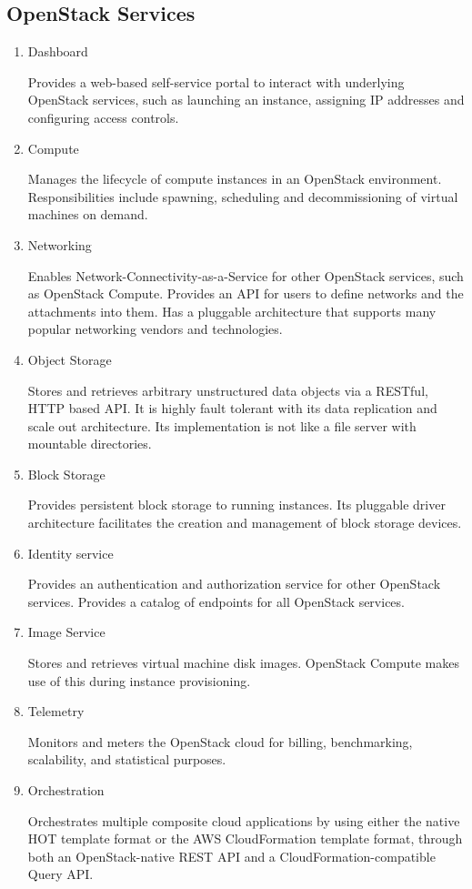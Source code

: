      \subsection{OpenStack Services}
     \begin{enumerate}
         \item Dashboard 
         \par
         Provides a web-based self-service portal to interact with underlying OpenStack services, such as launching an instance, assigning IP addresses and configuring access controls.%
         \item Compute 
         \par
         Manages the lifecycle of compute instances in an OpenStack environment. Responsibilities include spawning, scheduling and decommissioning of virtual machines on demand.%
         \item Networking
         \par
         Enables Network-Connectivity-as-a-Service for other OpenStack services, such as OpenStack Compute. Provides an API for users to define networks and the attachments into them. Has a pluggable architecture that supports many popular networking vendors and technologies.%
         \item Object Storage
         \par
         Stores and retrieves arbitrary unstructured data objects via a RESTful, HTTP based API. It is highly fault tolerant with its data replication and scale out architecture. Its implementation is not like a file server with mountable directories.%
         \item Block Storage
         \par
         Provides persistent block storage to running instances. Its pluggable driver architecture facilitates the creation and management of block storage devices.%
         \item Identity service
         \par
         Provides an authentication and authorization service for other OpenStack services. Provides a catalog of endpoints for all OpenStack services.%
         \item Image Service 
         \par
         Stores and retrieves virtual machine disk images. OpenStack Compute makes use of this during instance provisioning.%
         \item Telemetry 
         \par
         Monitors and meters the OpenStack cloud for billing, benchmarking, scalability, and statistical purposes.%
         \item Orchestration 
         \par
         Orchestrates multiple composite cloud applications by using either the native HOT template format or the AWS CloudFormation template format, through both an OpenStack-native REST API and a CloudFormation-compatible Query API.%
     \end{enumerate}
     